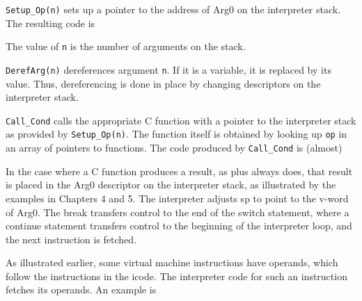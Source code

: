 \goodbreak
{}



\texttt{Setup\_Op(n)} sets up a pointer to the address of Arg0 on the
interpreter stack. The resulting code is


The value of \texttt{n} is the number of arguments on the stack.

\texttt{DerefArg(n)} dereferences argument \texttt{n}. If it is a
variable, it is replaced by its value. Thus, dereferencing is done in
place by changing descriptors on the interpreter stack.

\texttt{Call\_Cond} calls the appropriate C function with a pointer to
the interpreter stack as provided by \texttt{Setup\_Op(n)}. The
function itself is obtained by looking up \texttt{op} in an array of
pointers to functions.  The code produced by \texttt{Call\_Cond} is
(almost)

\goodbreak
\iconcode{
\>(*(optab(op]) )(rargp);\\
\>sp = (word * )rargp + 1:
}

In the case where a C function produces a result, as plus always does,
that result is placed in the Arg0 descriptor on the interpreter stack,
as illustrated by the examples in Chapters 4 and 5. The interpreter
adjusts sp to point to the v-word of Arg0. The break transfers control
to the end of the switch statement, where a continue statement
transfers control to the beginning of the interpreter loop, and the
next instruction is fetched.

As illustrated earlier, some virtual machine instructions have
operands, which follow the instructions in the icode. The interpreter
code for such an instruction fetches its operands. An example is

